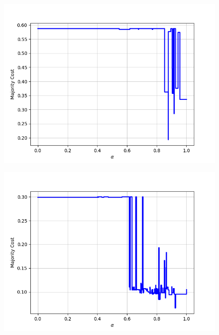 \begin{figure}[h]
\begin{minipage}{.24\textwidth}
\end{minipage}
\begin{minipage}{.24\textwidth}
  \centering
  {\includegraphics[width=\linewidth]{plots/nell-sc/sportsevent}}
\end{minipage}
\begin{minipage}{.24\textwidth}
  \centering
  {\includegraphics[width=\linewidth]{plots/nell-sc/traditionalgame}}
\end{minipage}
\begin{minipage}{.24\textwidth}
  \centering

\end{minipage}
\end{figure}
